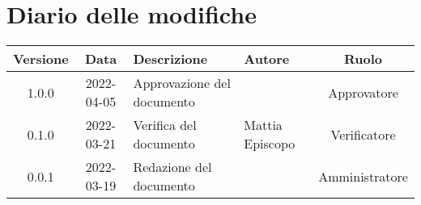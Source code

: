 \section*{Diario delle modifiche}
	\begin{center}
	\renewcommand{\arraystretch}{1.8} %
	\begin{tabular}{ |c|c|m{12em}|m{7em}|c| }
		\hline
		\textbf{Versione} & \textbf{Data} & \textbf{Descrizione} &  \textbf{Autore} &  \textbf{Ruolo} \\
		\hline
		1.0.0 & 2022-04-05 & Approvazione del documento & \docApprovazione & Approvatore\\
		\hline
		0.1.0 & 2022-03-21 & Verifica del documento & Mattia \newline Episcopo & Verificatore\\
		\hline
		0.0.1 & 2022-03-19 & Redazione del documento & \docRedattori & Amministratore\\
		\hline
	\end{tabular}
	\end{center}
	\newpage